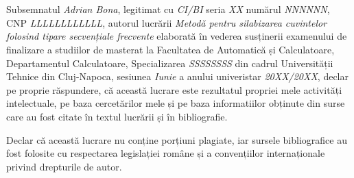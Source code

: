 \documentclass[12pt,a4paper,twoside,openright]{report}
\theoremstyle{definition}
\theoremstyle{remark}
\renewcommand{\thesisauthor}{Adrian Bona}    %
\renewcommand{\thesismonth}{Iunie}     %
\renewcommand{\thesistitle}{Metodă pentru silabizarea cuvintelor folosind tipare secvențiale frecvente}
\begin{document}
\begin{titlepage}
\phantom{1}
\end{titlepage}



\begin{titlepage}

\begin{center}
\thispagestyle{firststylewithfooter}


{\scshape \facultynameromanian} \\
{\scshape \departmentnameromanian} \\
\end{center}

\vspace{3cm}

\begin{center}
\autheticitydeclarationsize \textbf{\autheticitydeclarationromanian}
\end{center}

\vspace{1cm}

Subsemnatul \textit{\thesisauthor}, legitimat cu \textit{CI/BI} seria \textit{XX} numărul \textit{NNNNNN}, CNP \textit{LLLLLLLLLLLL}, autorul lucrării \textit{\thesistitle} elaborată în vederea susținerii examenului de finalizare a studiilor de masterat la Facultatea de Automatică și Calculatoare, Departamentul Calculatoare, Specializarea \textit{SSSSSSSS} din cadrul Universității Tehnice din Cluj-Napoca, sesiunea \textit{\thesismonth} a anului univeristar \textit{20XX/20XX}, declar pe proprie răspundere, că această lucrare este rezultatul propriei mele activități intelectuale, pe baza cercetărilor mele și pe baza informatiilor obținute din surse care au fost citate în textul lucrării și în bibliografie.

Declar că această lucrare nu conține porțiuni plagiate, iar sursele bibliografice au fost folosite cu respectarea legislației române și a convențiilor internaționale privind drepturile de autor.


\end{titlepage}
\end{document}

